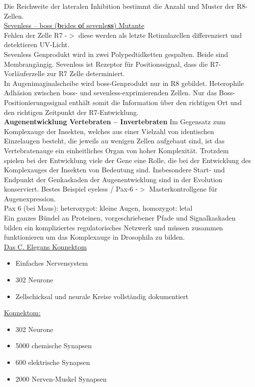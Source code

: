 \documentclass[12pt,a4paper]{article}
\begin{document}
Die Reichweite der lateralen Inhibition bestimmt die Anzahl und Muster der R8-Zellen.\\

\underline{Sevenless – boss (\textbf{b}rides \textbf{o}f sevenle\textbf{ss}) Mutante}\\
Fehlen der Zelle R7 -$>$ diese werden als letzte Retinulazellen differenziert und detektieren UV-Licht.\\
Sevenless Genprodukt wird in zwei Polypedtidketten gespalten. Beide sind Membrangängig. Sevenless ist Rezeptor für Positionssignal, dass die R7-Vorläuferzelle zur R7 Zelle determiniert.\\

In Augenimaginalscheibe wird boss-Genprodukt nur in R8 gebildet. Heterophile Adhäsion zwischen boss- und sevenless-exprimierenden Zellen. Nur das Boss-Positionierungssignal enthält somit die Information über den richtigen Ort und den richtigen Zeitpunkt der R7-Entwicklung.\\

\textbf{Augenentwicklung Vertebraten – Invertebraten}
Im Gegensatz zum Komplexauge der Insekten, welches aus einer Vielzahl von identischen Einzelaugen besteht, die jeweils au wenigen Zellen aufgebaut sind, ist das Vertebratenauge ein einheitliches Organ von hoher Komplexität. Trotzdem spielen bei der Entwicklung viele der Gene eine Rolle, die bei der Entwicklung des Komplexauges der Insekten von Bedeutung sind. Insbesondere Start- und Endpunkt der Genkaskaden der Augenentwicklung sind in der Evolution konserviert. Bestes Beispiel eyeless / Pax-6 -$>$ Masterkontrollgene für Augenexpression.\\
Pax 6 (bei Maus): heterozygot: kleine Augen, homozygot: letal\\

Ein ganzes Bündel an Proteinen, vorgeschriebener Pfade und Signalkaskaden bilden ein kompliziertes regulatorisches Netzwerk und müssen zusammen funktionieren um das Komplexauge in Drosophila zu bilden.\\

\underline{Das C. Elegans Konnektom}
\begin{itemize}
	\item Einfaches Nervensystem
	\item 302 Neurone
	\item Zellschicksal und neurale Kreise vollständig dokumentiert
\end{itemize}

\underline{Konnektom:}
\begin{itemize}
	\item 302 Neurone
	\item 5000 chemische Synapsen
	\item 600 elektrische Synapsen
	\item 2000 Nerven-Muskel Synapsen
\end{itemize}
\end{document}
